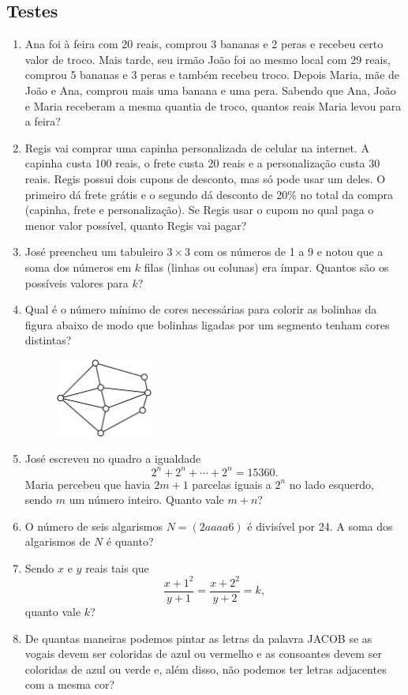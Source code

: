 \documentclass[12pt]{article}
\begin{document}
    \subsection{Testes}
      \begin{enumerate}[label=\textbf{\arabic*.}]
        \item Ana foi à feira com 20 reais, comprou 3 bananas e 2 peras e recebeu certo valor de troco. Mais tarde, seu irmão João foi ao
          mesmo local com 29 reais, comprou 5 bananas e 3 peras e também recebeu troco. Depois Maria, mãe de João e Ana, comprou mais uma
          banana e uma pera. Sabendo que Ana, João e Maria receberam a mesma quantia de troco, quantos reais Maria levou para a feira?
        \item Regis vai comprar uma capinha personalizada de celular na internet. A capinha custa 100 reais, o frete custa 20 reais e a
          personalização custa 30 reais. Regis possui dois cupons de desconto, mas só pode usar um deles. O primeiro dá frete grátis e o
          segundo dá desconto de 20\% no total da compra (capinha, frete e personalização). Se Regis usar o cupom no qual paga o menor valor
          possível, quanto Regis vai pagar?
        \item José preencheu um tabuleiro $3\times3$ com os números de 1 a 9 e notou que a soma dos números em \(k\) filas (linhas ou colunas)
          era ímpar. Quantos são os possíveis valores para \(k\)?
        \item Qual é o número mínimo de cores necessárias para colorir as bolinhas da figura abaixo de modo que bolinhas ligadas por um
          segmento tenham cores distintas?
          \begin{figure}[h]
            \centering
            \includegraphics[width=0.3\textwidth]{first.png}
          \end{figure}
        \item José escreveu no quadro a igualdade
          \[
            2^n + 2^n + \cdots + 2^n = 15360.
          \]
          Maria percebeu que havia \(2m+1\) parcelas iguais a \(2^n\) no lado esquerdo, sendo \(m\) um número inteiro. Quanto vale \(m+n\)?
        \item O número de seis algarismos \(N = (2aaaa6)\) é divisível por 24. A soma dos algarismos de \(N\) é quanto?
        \item Sendo \(x\) e \(y\) reais tais que
          \[
            \frac{x+1^2}{y+1} = \frac{x+2^2}{y+2} = k,
          \]
          quanto vale \(k\)?
        \item De quantas maneiras podemos pintar as letras da palavra JACOB se as vogais devem ser coloridas de azul ou vermelho e as
          consoantes devem ser coloridas de azul ou verde e, além disso, não podemos ter letras adjacentes com a mesma cor?


\end{enumerate}
\end{document}

